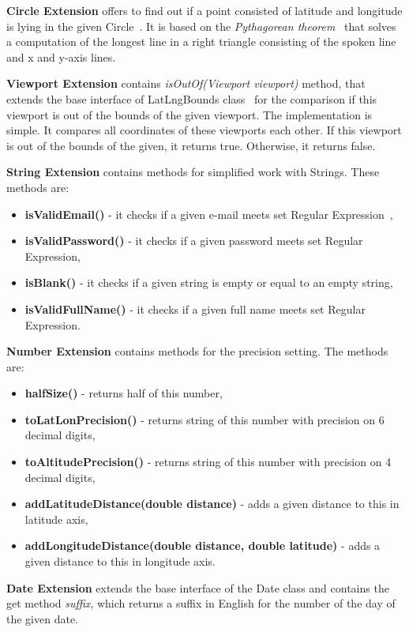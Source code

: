 \textbf{Circle Extension} offers to find out if a point consisted of latitude and longitude is lying in the given Circle~\cite{googleMapsCircles}.
It is based on the \textit{Pythagorean theorem}~\cite{pythagoreanTheorem} that solves a computation of the longest line in a right triangle consisting of the spoken line and x and y-axis lines.

\textbf{Viewport Extension} contains \textit{isOutOf(Viewport viewport)} method, that extends the base interface of LatLngBounds class~\cite{latLngBounds} for the comparison if this viewport is out of the bounds of the given viewport.
The implementation is simple.
It compares all coordinates of these viewports each other.
If this viewport is out of the bounds of the given, it returns true.
Otherwise, it returns false.

\textbf{String Extension} contains methods for simplified work with Strings.
These methods are:
\begin{itemize}
    \item \textbf{isValidEmail()} - it checks if a given e-mail meets set Regular Expression~\cite{regExp},
    \item \textbf{isValidPassword()} - it checks if a given password meets set Regular Expression,
    \item \textbf{isBlank()} - it checks if a given string is empty or equal to an empty string,
    \item \textbf{isValidFullName()} - it checks if a given full name meets set Regular Expression.
\end{itemize}
\textbf{Number Extension} contains methods for the precision setting.
The methods are:
\begin{itemize}
    \item \textbf{halfSize()} - returns half of this number,
    \item \textbf{toLatLonPrecision()} - returns string of this number with precision on 6 decimal digits,
    \item \textbf{toAltitudePrecision()} - returns string of this number with precision on 4 decimal digits,
    \item \textbf{addLatitudeDistance(double distance)} - adds a given distance to this in latitude axis,
    \item \textbf{addLongitudeDistance(double distance, double latitude)} - adds a given distance to this in longitude axis.
\end{itemize}

\textbf{Date Extension} extends the base interface of the Date class and contains the get method \textit{suffix}, which returns a suffix in English for the number of the day of the given date.

